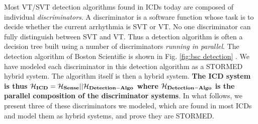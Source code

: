 Most \ac{VT}/\ac{SVT} detection algorithms found in ICDs today are composed of individual \emph{discriminators}. 
A discriminator is a software function whose task is to decide whether the current arrhythmia is SVT or VT. 
No one discriminator can fully distinguish between SVT and VT.
Thus a detection algorithm is often a decision tree built using a number of discriminators \emph{running in parallel}.
The detection algorithm of Boston Scientific is shown in Fig. \ref{fig:bsc detection} \cite{compass}.
We have modeled each discriminator in this detection algorithm as a STORMED hybrid system.
The algorithm itself is then a hybrid system.
\textbf{The ICD system is thus 
$\mathbf{\mathcal{H}_{ICD} = \mathcal{H}_{Sense}||\mathcal{H}_{Detection-Algo}}$ where $\mathbf{\mathcal{H}_{Detection-Algo}}$ is the parallel composition of the discriminator systems}.
In what follows, we present three of these discriminators we modeled, which are found in most ICDs and model them as hybrid systems, and prove they are STORMED.
